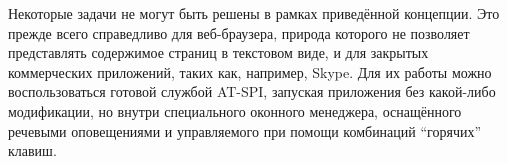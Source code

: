 \documentclass[10pt, a5paper]{article}
\begin{document}
Некоторые задачи не могут быть решены в рамках приведённой концепции. Это прежде всего справедливо для веб-браузера, природа которого не позволяет представлять содержимое страниц в текстовом виде, и для закрытых коммерческих приложений, таких как, например, Skype. Для их работы можно воспользоваться готовой службой AT-SPI, запуская приложения без какой-либо модификации, но внутри специального оконного менеджера, оснащённого речевыми оповещениями и управляемого при помощи комбинаций ``горячих'' клавиш.
\end{document}
